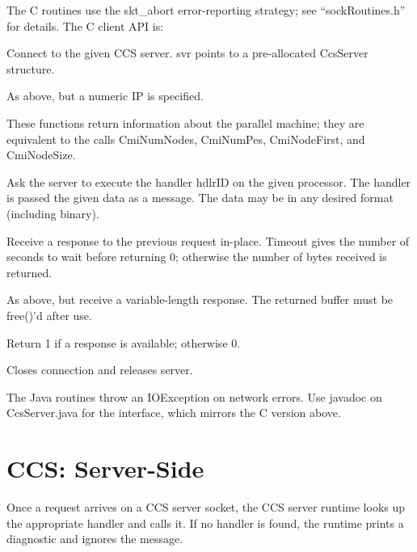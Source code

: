 The C routines use the skt\_abort error-reporting strategy;
see ``sockRoutines.h'' for details.  The C client API is:

Connect to the given CCS server.  svr points to a pre-allocated
CcsServer structure.

As above, but a numeric IP is specified.

These functions return information about the parallel machine;
they are equivalent to the \converse{} calls CmiNumNodes,
CmiNumPes, CmiNodeFirst, and CmiNodeSize.

Ask the server to execute the handler hdlrID on the given processor.
The handler is passed the given data as a message.  The data may
be in any desired format (including binary). 

Receive a response to the previous request in-place.
Timeout gives the number of seconds to wait before returning 0;
otherwise the number of bytes received is returned. 

As above, but receive a variable-length response.  The
returned buffer must be free()'d after use.

Return 1 if a response is available; otherwise 0.

Closes connection and releases server.


The Java routines throw an IOException on network errors.
Use javadoc on CcsServer.java for the interface, which mirrors
the C version above.


\section{CCS: Server-Side}

Once a request arrives on a CCS server socket, the CCS server 
runtime looks up the appropriate handler and calls it.
If no handler is found, the runtime prints a diagnostic
and ignores the message.

